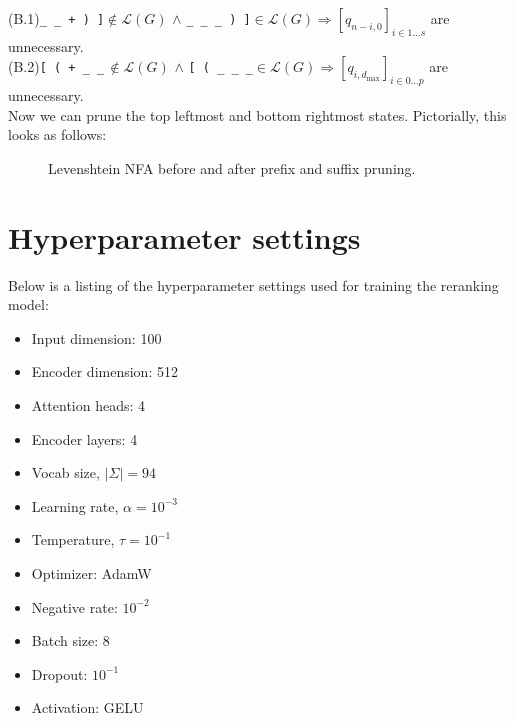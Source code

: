 \documentclass[sigplan,review,acmsmall,nonacm,screen,anonymous]{acmart}\settopmatter{printfolios=false,printccs=false,printacmref=false}
\begin{document}
\noindent(B.1)\phantom{..}\texttt{\_ \_ + ) ]}\phantom{.}$\not\in \mathcal{L}(G)$\phantom{...}\phantom{...} $\land$ \phantom{...}\texttt{\_ \_ \_ ) ]}\phantom{...}$\in \mathcal{L}(G)$\phantom{...}\phantom{...}$\Longrightarrow [q_{n-i, 0}]_{i \in 1\ldots s}$ are unnecessary.\\
\noindent(B.2)\phantom{..}\texttt{[ ( + \_ \_}$\hspace{2pt}\not\in \mathcal{L}(G)$\phantom{...}\phantom{...} $\land$ \phantom{...}\texttt{[ ( \_ \_ \_}\phantom{...}$\in \mathcal{L}(G)$\phantom{...}\phantom{...}$\Longrightarrow [q_{i, d_{\max}}]_{i \in 0\ldots p}$ are unnecessary.\\

\noindent Now we can prune the top leftmost and bottom rightmost states. Pictorially, this looks as follows:

\begin{figure}[H]
  \resizebox{0.47\textwidth}{!}{
    
  }
  \resizebox{0.47\textwidth}{!}{
    
  }
  \caption{Levenshtein NFA before and after prefix and suffix pruning.}
\end{figure}\vspace{-0.175cm}

\section{Hyperparameter settings}\label{sec:hyperparams}

Below is a listing of the hyperparameter settings used for training the reranking model:

\begin{multicols}{3}
\begin{itemize}
\item Input dimension: 100
\item Encoder dimension: 512
\item Attention heads: 4
\item Encoder layers: 4
\item Vocab size, $|\Sigma|= 94$
\item Learning rate, $\alpha= 10^{-3}$
\item Temperature, $\tau= 10^{-1}$
\item Optimizer: AdamW
\item Negative rate: $10^{-2}$
\item Batch size: 8
\item Dropout: $10^{-1}$
\item Activation: GELU
\end{itemize}
\end{multicols}
\end{document}
